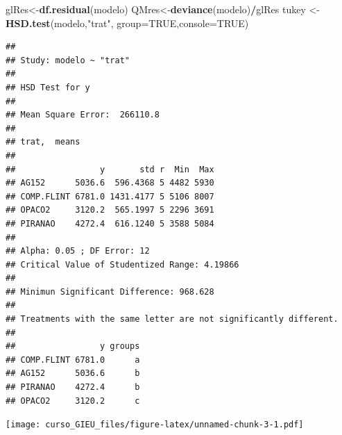 \documentclass[
]{book}
\newenvironment{Shaded}{\begin{snugshade}}{\end{snugshade}}
\newcommand{\CommentTok}[1]{\textcolor[rgb]{0.56,0.35,0.01}{\textit{#1}}}
\newcommand{\DataTypeTok}[1]{\textcolor[rgb]{0.13,0.29,0.53}{#1}}
\newcommand{\DecValTok}[1]{\textcolor[rgb]{0.00,0.00,0.81}{#1}}
\newcommand{\FloatTok}[1]{\textcolor[rgb]{0.00,0.00,0.81}{#1}}
\newcommand{\KeywordTok}[1]{\textcolor[rgb]{0.13,0.29,0.53}{\textbf{#1}}}
\newcommand{\NormalTok}[1]{#1}
\newcommand{\OperatorTok}[1]{\textcolor[rgb]{0.81,0.36,0.00}{\textbf{#1}}}
\newcommand{\OtherTok}[1]{\textcolor[rgb]{0.56,0.35,0.01}{#1}}
\newcommand{\StringTok}[1]{\textcolor[rgb]{0.31,0.60,0.02}{#1}}
\begin{document}
\begin{Shaded}
\begin{Highlighting}[]
\NormalTok{glRes<-}\KeywordTok{df.residual}\NormalTok{(modelo)}
\NormalTok{QMres<-}\KeywordTok{deviance}\NormalTok{(modelo)}\OperatorTok{/}\NormalTok{glRes}
\NormalTok{tukey <-}\StringTok{ }\KeywordTok{HSD.test}\NormalTok{(modelo,}\StringTok{"trat"}\NormalTok{, }\DataTypeTok{group=}\OtherTok{TRUE}\NormalTok{,}\DataTypeTok{console=}\OtherTok{TRUE}\NormalTok{)}
\end{Highlighting}
\end{Shaded}

\begin{verbatim}
## 
## Study: modelo ~ "trat"
## 
## HSD Test for y 
## 
## Mean Square Error:  266110.8 
## 
## trat,  means
## 
##                 y       std r  Min  Max
## AG152      5036.6  596.4368 5 4482 5930
## COMP.FLINT 6781.0 1431.4177 5 5106 8007
## OPACO2     3120.2  565.1997 5 2296 3691
## PIRANAO    4272.4  616.1240 5 3588 5084
## 
## Alpha: 0.05 ; DF Error: 12 
## Critical Value of Studentized Range: 4.19866 
## 
## Minimun Significant Difference: 968.628 
## 
## Treatments with the same letter are not significantly different.
## 
##                 y groups
## COMP.FLINT 6781.0      a
## AG152      5036.6      b
## PIRANAO    4272.4      b
## OPACO2     3120.2      c
\end{verbatim}

\begin{Shaded}
\end{Shaded}

\texttt{[image: curso\_GIEU\_files/figure-latex/unnamed-chunk-3-1.pdf]}

\begin{Shaded}
\end{Shaded}
\end{document}
